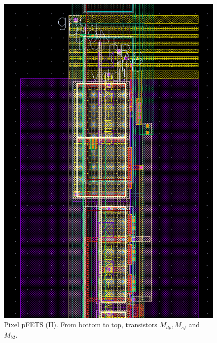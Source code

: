 \begin{figure}
    \center
    \includegraphics{pixel3.png}
    \caption{Pixel pFETS (II). From bottom to top, transistors $M_{dp}, M_{sf}$ and $M_{b2}$.}
    \label{tres}
\end{figure}

